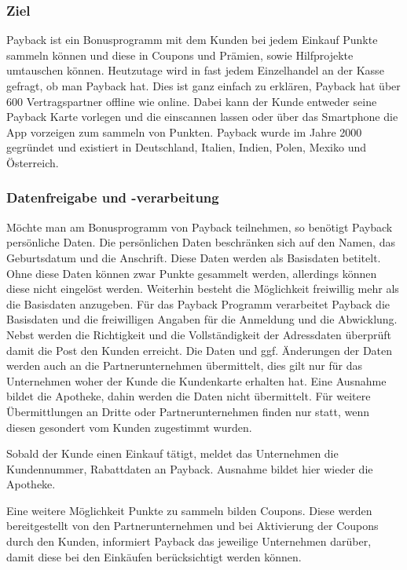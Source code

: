\subsubsection{Ziel}
Payback ist ein Bonusprogramm mit dem Kunden bei jedem Einkauf Punkte sammeln können und diese in Coupons und Prämien, sowie Hilfprojekte umtauschen können. \newline
Heutzutage wird in fast jedem Einzelhandel an der Kasse gefragt, ob man Payback hat. Dies ist ganz einfach zu erklären, Payback hat über 600 Vertragspartner offline wie online. Dabei kann der Kunde entweder seine Payback Karte vorlegen und die einscannen lassen oder über das Smartphone die App vorzeigen zum sammeln von Punkten. \label{Payback} \newline
Payback wurde im Jahre 2000 gegründet und existiert in Deutschland, Italien, Indien, Polen, Mexiko und Österreich. \label{Payback_Info} \newline

\subsubsection{Datenfreigabe und -verarbeitung}
Möchte man am Bonusprogramm von Payback teilnehmen, so benötigt Payback persönliche Daten. Die persönlichen Daten beschränken sich auf den Namen, das Geburtsdatum und die Anschrift. Diese Daten werden als Basisdaten betitelt. Ohne diese Daten können zwar Punkte gesammelt werden, allerdings können diese nicht eingelöst werden. Weiterhin besteht die Möglichkeit freiwillig mehr als die Basisdaten anzugeben. Für das Payback Programm verarbeitet Payback die Basisdaten und die freiwilligen Angaben für die Anmeldung und die Abwicklung. Nebst werden die Richtigkeit und die Vollständigkeit der Adressdaten überprüft damit die Post den Kunden erreicht.
Die Daten und ggf. Änderungen der Daten werden auch an die Partnerunternehmen übermittelt, dies gilt nur für das Unternehmen woher der Kunde die Kundenkarte erhalten hat. Eine Ausnahme bildet die Apotheke, dahin werden die Daten nicht übermittelt. Für weitere Übermittlungen an Dritte oder Partnerunternehmen finden nur statt, wenn diesen gesondert vom Kunden zugestimmt wurden. \newline

Sobald der Kunde einen Einkauf tätigt, meldet das Unternehmen die Kundennummer, Rabattdaten an Payback.  Ausnahme bildet hier wieder die Apotheke. \newline

Eine weitere Möglichkeit Punkte zu sammeln bilden Coupons. Diese werden bereitgestellt von den Partnerunternehmen und bei Aktivierung der Coupons durch den Kunden, informiert Payback das jeweilige Unternehmen darüber, damit diese bei den Einkäufen berücksichtigt werden können.

